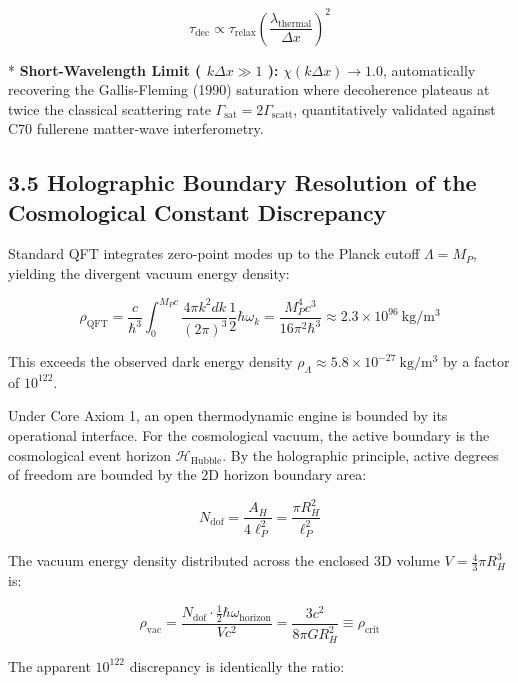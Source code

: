 \documentclass[11pt,a4paper]{article}
\theoremstyle{definition}\newtheorem{definition}{Definition}
\theoremstyle{remark}\newtheorem{remark}{Remark}
\begin{document}
\begin{equation}
\tau_{\text{dec}} \propto \tau_{\text{relax}} \left( \frac{\lambda_{\text{thermal}}}{\Delta x} \right)^2
\end{equation}


* \textbf{Short-Wavelength Limit ( $k \Delta x \gg 1$ ):} $\chi(k \Delta x) \to 1.0$, automatically recovering the Gallis-Fleming (1990) saturation where decoherence plateaus at twice the classical scattering rate $\Gamma_{\text{sat}} = 2 \Gamma_{\text{scatt}}$, quantitatively validated against C70 fullerene matter-wave interferometry.
\subsection{3.5 Holographic Boundary Resolution of the Cosmological Constant Discrepancy}

Standard QFT integrates zero-point modes up to the Planck cutoff $\Lambda = M_P$, yielding the divergent vacuum energy density:


\begin{equation}
\rho_{\text{QFT}} = \frac{c}{\hbar^3} \int_0^{M_P c} \frac{4\pi k^2 dk}{(2\pi)^3} \frac{1}{2} \hbar \omega_k = \frac{M_P^4 c^3}{16\pi^2 \hbar^3} \approx 2.3 \times 10^{96}\ \mathrm{kg/m^3}
\end{equation}


This exceeds the observed dark energy density $\rho_\Lambda \approx 5.8 \times 10^{-27}\ \mathrm{kg/m^3}$ by a factor of $10^{122}$.

Under Core Axiom 1, an open thermodynamic engine is bounded by its operational interface. For the cosmological vacuum, the active boundary is the cosmological event horizon $\mathcal{H}_{\text{Hubble}}$. By the holographic principle, active degrees of freedom are bounded by the 2D horizon boundary area:


\begin{equation}
N_{\text{dof}} = \frac{A_H}{4 \ell_P^2} = \frac{\pi R_H^2}{\ell_P^2}
\end{equation}


The vacuum energy density distributed across the enclosed 3D volume $V = \frac{4}{3}\pi R_H^3$ is:


\begin{equation}
\rho_{\text{vac}} = \frac{N_{\text{dof}} \cdot \frac{1}{2} \hbar \omega_{\text{horizon}}}{V c^2} = \frac{3 c^2}{8\pi G R_H^2} \equiv \rho_{\text{crit}}
\end{equation}


The apparent $10^{122}$ discrepancy is identically the ratio:
\end{document}
